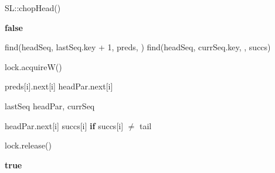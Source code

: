 \begin{algorithm}[!htb]
	\caption{SL::chopHead()}
	\label{alg:ChopHead}
	\begin{algorithmic}[1]
		\State \Return \textbf{false}
		\EndIf
		
		\State find(headSeq, lastSeq.key + 1, preds, \nullvalue)
		\State find(headSeq, currSeq.key, \nullvalue, succs)
		
		\State lock.acquireW()
		
		preds[i].next[i] \attr headPar.next[i]
		\EndFor
		
		\State lastSeq \attr headPar, currSeq \attr \nullvalue
		
		\State headPar.next[i] \attr succs[i] \textbf{if} succs[i] $\ne$ tail
		\EndFor
		
		\State lock.release()
		
		\State \Return \textbf{true}
	\end{algorithmic}
\end{algorithm}